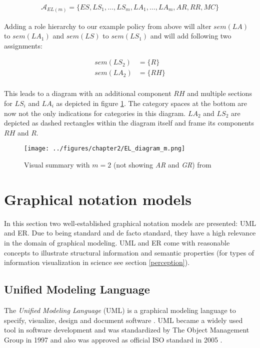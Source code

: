 \documentclass[twoside, openright, 12pt]{book}
\begin{document}
\begin{align*}
\mathcal{A}_{EL(m)} = \lbrace ES,LS_1, \dots,LS_m, LA_1, \dots, LA_m,AR,RR,MC\rbrace
\end{align*}

\noindent
Adding a role hierarchy to our example policy from above will alter $sem(LA)$ to $sem(LA_1)$ and $sem(LS)$ to $sem(LS_1)$ and will add following two assignments:

\begin{align*}
sem(LS_2) &= \lbrace R \rbrace\\
sem(LA_2) &= \lbrace RH \rbrace\\
\end{align*}

\noindent
This leads to a diagram with an additional component $RH$ and multiple sections for $LS_i$ and $LA_i$ as depicted in figure \ref{fig:EL_diagram_m}.
The category spaces at the bottom are now not the only indications for categories in this diagram.
$LA_2$ and $LS_2$ are depicted as dashed rectangles within the diagram itself and frame its components $RH$ and $R$.

\begin{figure}[htb]
	\centering
	\texttt{[image: ../figures/chapter2/EL\_diagram\_m.png]}
	\caption{Visual summary with $m=2$ (not showing \textit{AR} and \textit{GR}) from \cite[p.79, figure 4.4]{Amthor18}}
	\label{fig:EL_diagram_m}
\end{figure}



\section{Graphical notation models}
\label{graphical_notations}
In this section two well-established graphical notation models are presented: UML and ER.
Due to being standard and de facto standard, they have a high relevance in the domain of graphical modeling. 
UML and ER come with reasonable concepts to illustrate structural information and semantic properties (for types of information visualization in science see section \ref{perception}).

\subsection{Unified Modeling Language}
\label{UML}
The \textit{Unified Modeling Language} (UML) is a graphical modeling language to specify, visualize, design and document software \citep{UML_OMG}.
UML became a widely used tool in software development and was standardized by The Object Management Group in 1997 and also was approved as official ISO standard in 2005 \citep{UML_ISO}.
\end{document}

